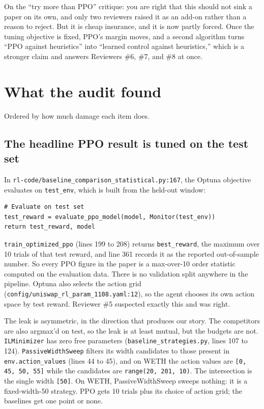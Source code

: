 \documentclass[11pt,a4paper]{article}
\newcommand{\code}[1]{\texttt{\small #1}}
\begin{document}
On the ``try more than PPO'' critique: you are right that this should not sink a paper on its own,
and only two reviewers raised it as an add-on rather than a reason to reject. But it is cheap
insurance, and it is now partly forced. Once the tuning objective is fixed, PPO's margin moves,
and a second algorithm turns ``PPO against heuristics'' into ``learned control against
heuristics,'' which is a stronger claim and answers Reviewers \#6, \#7, and \#8 at once.

\section{What the audit found}

Ordered by how much damage each item does.

\subsection{The headline PPO result is tuned on the test set}

In \code{rl-code/baseline\_comparison\_statistical.py:167}, the Optuna objective evaluates on
\code{test\_env}, which is built from the held-out window:

\begin{lstlisting}
# Evaluate on test set
test_reward = evaluate_ppo_model(model, Monitor(test_env))
return test_reward, model
\end{lstlisting}

\code{train\_optimized\_ppo} (lines 199 to 208) returns \code{best\_reward}, the maximum over 10
trials of that test reward, and line 361 records it as the reported out-of-sample number. So every
PPO figure in the paper is a max-over-10 order statistic computed on the evaluation data. There is
no validation split anywhere in the pipeline. Optuna also selects the action grid
(\code{config/uniswap\_rl\_param\_1108.yaml:12}), so the agent chooses its own action space by test
reward. Reviewer \#5 suspected exactly this and was right.

The leak is asymmetric, in the direction that produces our story. The competitors are also
argmax'd on test, so the leak is at least mutual, but the budgets are not. \code{ILMinimizer} has
zero free parameters (\code{baseline\_strategies.py}, lines 107 to 124). \code{PassiveWidthSweep} filters
its width candidates to those present in \code{env.action\_values} (lines 44 to 45), and on WETH
the action values are \code{[0, 45, 50, 55]} while the candidates are \code{range(20, 201, 10)}.
The intersection is the single width \code{[50]}. On WETH, PassiveWidthSweep sweeps nothing: it is
a fixed-width-50 strategy. PPO gets 10 trials plus its choice of action grid; the baselines get
one point or none.
\end{document}
